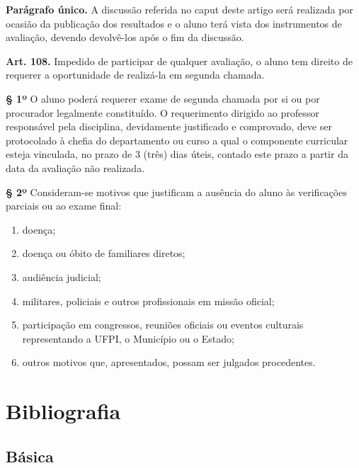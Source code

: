\documentclass[a4paper, 12pt]{article}
\begin{document}
\textbf{Parágrafo único.} A discussão referida no caput deste artigo será realizada por ocasião da publicação dos resultados e o aluno terá vista dos instrumentos de avaliação, devendo devolvê-los após o fim da discussão.

\noindent\textbf{Art. 108.} Impedido de participar de qualquer avaliação, o aluno tem direito de requerer a oportunidade de realizá-la em segunda chamada.

\textbf{§ 1º} O aluno poderá requerer exame de segunda chamada por si ou por procurador legalmente constituído. O requerimento dirigido ao professor responsável pela disciplina, devidamente justificado e comprovado, deve ser protocolado à chefia do departamento ou curso a qual o componente curricular esteja vinculada, no prazo de 3 (três) dias úteis, contado este prazo a partir da data da avaliação não realizada.

\textbf{§ 2º} Consideram-se motivos que justificam a ausência do aluno às verificações parciais ou ao exame final:
\begin{enumerate}[label= \alph*)]
    \item doença;
    \item doença ou óbito de familiares diretos;
    \item audiência judicial;
    \item militares, policiais e outros profissionais em missão oficial;
    \item participação em congressos, reuniões oficiais ou eventos culturais
    representando a UFPI, o Município ou o Estado;
    \item outros motivos que, apresentados, possam ser julgados procedentes.
\end{enumerate}

\section{Bibliografia}

\subsection{Básica}
\end{document}
